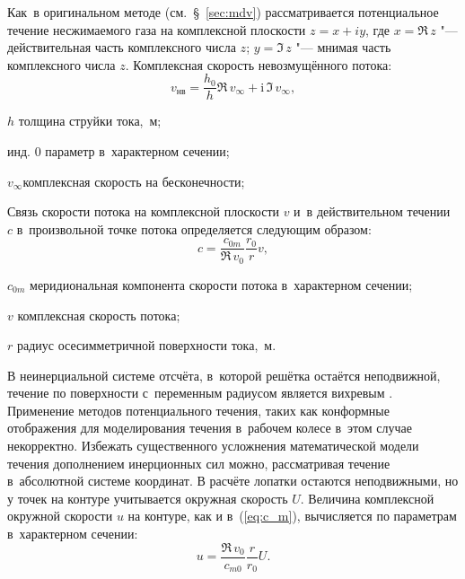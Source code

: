  Как~в оригинальном методе (см.~\S~\ref{sec:mdv}) рассматривается потенциальное течение несжимаемого газа на комплексной плоскости \(z=x+iy\), где \(x=\Re \, z\) "--- действительная часть комплексного числа \(z\); \(y=\Im \, z\) "--- мнимая часть комплексного числа \(z\).
Комплексная скорость невозмущённого потока:
\begin{equation}
	v_{\text{нв}}=\frac{h_{0}}{h}\Re\,v_{\infty} + \mathrm{i}\,\Im \, v_{\infty},
	\label{eq:V_inf}
\end{equation}
\begin{eqexpl}
	\item{\(h\)} толщина струйки тока,~м;
	\item{инд. \({0}\)} параметр в~характерном сечении;
	\item{\(v_{\infty}\)}комплексная скорость на бесконечности;
\end{eqexpl}

Связь скорости потока на комплексной плоскости \(v\) и~в действительном течении \(c\) в~произвольной точке потока определяется следующим образом:
\begin{equation}
	c=\frac{c_{0m}}{\Re\,v_{0}}\frac{r_{0}}{r}v,
	\label{eq:c_m}
\end{equation}
\begin{eqexpl}
\item{\(c_{0m}\)} меридиональная компонента скорости потока в~характерном сечении;
\item{\(v\)} комплексная скорость потока;
\item{\(r\)} радиус осесимметричной поверхности тока,~м.
\end{eqexpl}

В неинерциальной системе отсчёта, в~которой решётка остаётся неподвижной, течение по поверхности с~переменным радиусом является вихревым \autocite{Jukovskiy1967}.
Применение методов потенциального течения, таких как конформные отображения для моделирования течения в~рабочем колесе в~этом случае некорректно.
Избежать существенного усложнения математической модели течения дополнением инерционных сил можно, рассматривая течение в~абсолютной системе координат.
В расчёте лопатки остаются неподвижными, но у точек на контуре учитывается окружная скорость \(U\).
Величина комплексной окружной скорости \(u\) на контуре, как и в~(\ref{eq:c_m}), вычисляется по параметрам в~характерном сечении:
\begin{equation}
	u=\frac{\Re\,v_{0}}{c_{m0}}\frac{r}{r_{0}}U.
	\label{eq:u}
\end{equation}

